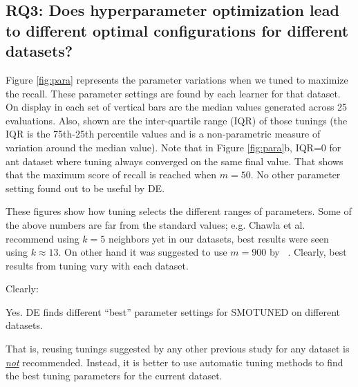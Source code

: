 \documentclass[10pt,conference]{IEEEtran}
\theoremstyle{break}
\theoremstyle{break}
\begin{document}

\subsection{\textbf{RQ3: Does hyperparameter optimization lead to different optimal configurations for different datasets?}}

Figure \ref{fig:para} represents the parameter variations when we tuned to maximize the recall. These parameter settings are found by each learner for that dataset.
On display in each set of vertical bars are
the median values generated across 25 evaluations.
Also, shown are
the inter-quartile range (IQR) of those tunings (the IQR is the 75th-25th percentile values and is a non-parametric measure of variation
around the median value). Note that in Figure \ref{fig:para}b, IQR=0 for  ant dataset where tuning always converged on the same final value. That shows that the maximum score of recall is reached when $m=50$. No other parameter setting found out to be useful by DE.

  These figures
show how tuning selects the different ranges  of
parameters.
Some of the above numbers are far from the standard values; e.g. Chawla et al.~\cite{chawla2002smote} recommend using $k=5$ neighbors yet in our datasets, best results were seen using $k \approx 13$. On other hand it was suggested to use $m=900$ by ~\cite{pears2014synthetic}.
Clearly,
best results from tuning
vary with each dataset.

Clearly:
\begin{lesson1}
    Yes. DE finds different ``best'' parameter settings for SMOTUNED on different datasets.
\end{lesson1}
 That is,  reusing tunings  suggested  by  any other  previous study  for any dataset is \underline{{\em not}} recommended. Instead,  it is better to
      use  automatic  tuning  methods  to find the best tuning parameters for the current dataset.
      
\end{document}
